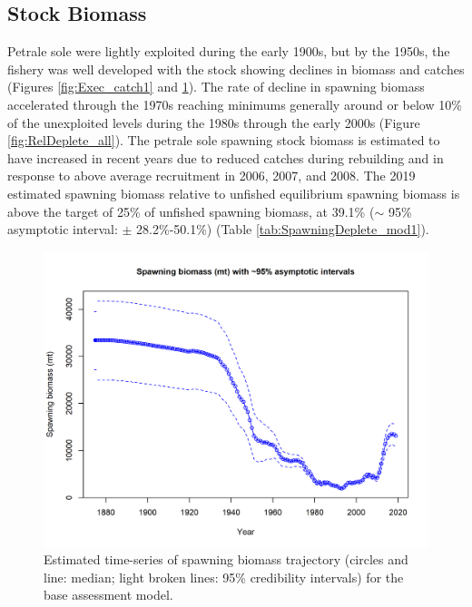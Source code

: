 \documentclass[12pt,]{article}
\begin{document}
\subsection*{Stock Biomass}\label{stock-biomass}

Petrale sole were lightly exploited during the early 1900s, but by the
1950s, the fishery was well developed with the stock showing declines in
biomass and catches (Figures \ref{fig:Exec_catch1} and
\ref{fig:Spawnbio_all}). The rate of decline in spawning biomass
accelerated through the 1970s reaching minimums generally around or
below 10\% of the unexploited levels during the 1980s through the early
2000s (Figure \ref{fig:RelDeplete_all}). The petrale sole spawning stock
biomass is estimated to have increased in recent years due to reduced
catches during rebuilding and in response to above average recruitment
in 2006, 2007, and 2008. The 2019 estimated spawning biomass relative to
unfished equilibrium spawning biomass is above the target of 25\% of
unfished spawning biomass, at 39.1\% (\(\sim\) 95\% asymptotic interval:
\(\pm\) 28.2\%-50.1\%) (Table \ref{tab:SpawningDeplete_mod1}).

\begin{figure}
\centering
\includegraphics{r4ss/plots_mod1/ts7_Spawning_biomass_(mt)_with_95_asymptotic_intervals_intervals.png}
\caption{Estimated time-series of spawning biomass trajectory (circles
and line: median; light broken lines: 95\% credibility intervals) for
the base assessment model. \label{fig:Spawnbio_all}}
\end{figure}
\end{document}
